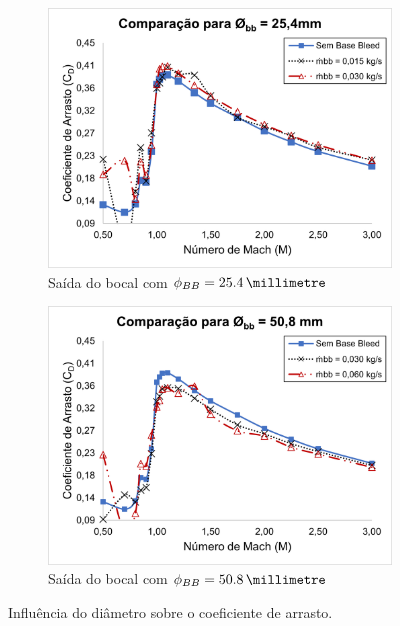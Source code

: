 \begin{figure}[!ht]
	\centering
	\begin{subfigure}[b]{0.47\textwidth}
    	\centering
    	\includegraphics[width=\textwidth]{cd-combasebleed-diametro-1pol.png}
    	\caption{Saída do bocal com $\phi_{BB} = \qty{25,4}{\millimetre}$}
    	\label{fig:comparacao-bb-diametro-1pol}
    \end{subfigure}
    \hfill
	\begin{subfigure}[b]{0.47\textwidth}
    	\centering
    	\includegraphics[width=\textwidth]{cd-combasebleed-diametro-2pol.png}
    	\caption{Saída do bocal com $\phi_{BB} = \qty{50,8}{\millimetre}$}
    	\label{fig:comparacao-bb-diametro-2pol}
    \end{subfigure}
	\caption{Influência do diâmetro sobre o coeficiente de arrasto.}
	\label{fig:comparacao-bb-diametro-vazoes}
\end{figure}

